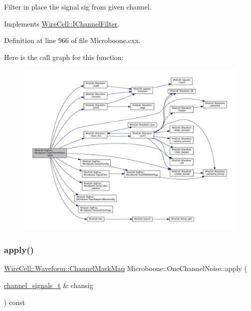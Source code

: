 Filter in place the signal {\ttfamily sig} from given {\ttfamily channel}. 

Implements \hyperlink{class_wire_cell_1_1_i_channel_filter_a6981186ee38a4b9b66e16c0d9b376b08}{Wire\+Cell\+::\+I\+Channel\+Filter}.



Definition at line 966 of file Microboone.\+cxx.

Here is the call graph for this function\+:
\nopagebreak
\begin{figure}[H]
\begin{center}
\leavevmode
\includegraphics[width=350pt]{class_wire_cell_1_1_sig_proc_1_1_microboone_1_1_one_channel_noise_a4d5cb537b5d9ca736fc1bbd3c463b76f_cgraph}
\end{center}
\end{figure}
\mbox{\label{class_wire_cell_1_1_sig_proc_1_1_microboone_1_1_one_channel_noise_a89d35e0006bd5a44cdd046e2d9549fa4}} 
\subsubsection{\texorpdfstring{apply()}{apply()}\hspace{0.1cm}{\footnotesize\ttfamily [2/2]}}
{\footnotesize\ttfamily \hyperlink{namespace_wire_cell_1_1_waveform_a18b9ae61c858e340252ba3ac83ac3bc0}{Wire\+Cell\+::\+Waveform\+::\+Channel\+Mask\+Map} Microboone\+::\+One\+Channel\+Noise\+::apply (\begin{DoxyParamCaption}\item[{\hyperlink{class_wire_cell_1_1_i_channel_filter_a44de35ce47701d84cd45393c6bcd5e2f}{channel\+\_\+signals\+\_\+t} \&}]{chansig }\end{DoxyParamCaption}) const\hspace{0.3cm}{\ttfamily [virtual]}}


